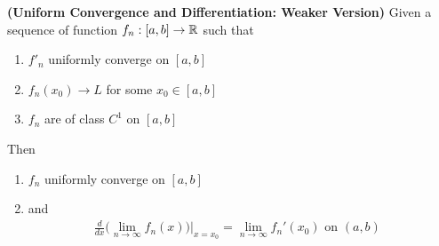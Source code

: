 \documentclass{report}
\begin{document}
\begin{theorem}
\textbf{(Uniform Convergence and Differentiation: Weaker Version)} Given a sequence of function $f_n:[a,b]\rightarrow \mathbb{R}$ such that 
\begin{enumerate}[label=(\alph*)]
  \item $f'_n$ uniformly converge on  $[a,b]$
  \item $f_n(x_0)\to L$ for some $x_0 \in [a,b]$
  \item $f_n$ are of class $C^1$ on $[a,b]$ 
\end{enumerate}

Then 
\begin{enumerate}[label=(\alph*)]
  \item $f_n$ uniformly converge on  $[a,b]$ 
  \item and
\begin{align*}
\frac{d}{dx}\Big(\lim_{n\to \infty}f_n(x) \Big)\Big|_{x=x_0}=\lim_{n\to \infty}f_n'(x_0)\text{ on $(a,b)$ }
\end{align*}
\end{enumerate}
\end{theorem}
\end{document}
